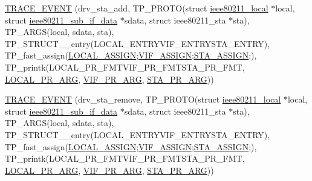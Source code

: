 \begin{DoxyCompactItemize}
\item 
\hyperlink{driver-trace_8h_a9ad991ec5ffa3b7c68a490dcf2170532}{T\-R\-A\-C\-E\-\_\-\-E\-V\-E\-N\-T} (drv\-\_\-sta\-\_\-add, T\-P\-\_\-\-P\-R\-O\-T\-O(struct \hyperlink{structieee80211__local}{ieee80211\-\_\-local} $\ast$local, struct \hyperlink{structieee80211__sub__if__data}{ieee80211\-\_\-sub\-\_\-if\-\_\-data} $\ast$sdata, struct ieee80211\-\_\-sta $\ast$sta), T\-P\-\_\-\-A\-R\-G\-S(local, sdata, sta), T\-P\-\_\-\-S\-T\-R\-U\-C\-T\-\_\-\-\_\-entry(L\-O\-C\-A\-L\-\_\-\-E\-N\-T\-R\-Y\-V\-I\-F\-\_\-\-E\-N\-T\-R\-Y\-S\-T\-A\-\_\-\-E\-N\-T\-R\-Y), T\-P\-\_\-fast\-\_\-assign(\hyperlink{driver-trace_8h_ab19d9141887ea92ef9640df06a51e0a1}{L\-O\-C\-A\-L\-\_\-\-A\-S\-S\-I\-G\-N};\hyperlink{driver-trace_8h_af5ede80f04ffcb3f644f68837b1d252c}{V\-I\-F\-\_\-\-A\-S\-S\-I\-G\-N};\hyperlink{driver-trace_8h_abbd837b5fc444c0cb48b5954f8ad068a}{S\-T\-A\-\_\-\-A\-S\-S\-I\-G\-N};), T\-P\-\_\-printk(L\-O\-C\-A\-L\-\_\-\-P\-R\-\_\-\-F\-M\-T\-V\-I\-F\-\_\-\-P\-R\-\_\-\-F\-M\-T\-S\-T\-A\-\_\-\-P\-R\-\_\-\-F\-M\-T, \hyperlink{driver-trace_8h_aa2a77a17621ecb4f0b3926fec90a5538}{L\-O\-C\-A\-L\-\_\-\-P\-R\-\_\-\-A\-R\-G}, \hyperlink{driver-trace_8h_a12c9f3afcd1c461f7ae2f86fd8503977}{V\-I\-F\-\_\-\-P\-R\-\_\-\-A\-R\-G}, \hyperlink{driver-trace_8h_a3b71cc34bae124028f19970a4220d4ab}{S\-T\-A\-\_\-\-P\-R\-\_\-\-A\-R\-G}))
\item 
\hyperlink{driver-trace_8h_a595ece6ce37c8e2a3284d14397af0385}{T\-R\-A\-C\-E\-\_\-\-E\-V\-E\-N\-T} (drv\-\_\-sta\-\_\-remove, T\-P\-\_\-\-P\-R\-O\-T\-O(struct \hyperlink{structieee80211__local}{ieee80211\-\_\-local} $\ast$local, struct \hyperlink{structieee80211__sub__if__data}{ieee80211\-\_\-sub\-\_\-if\-\_\-data} $\ast$sdata, struct ieee80211\-\_\-sta $\ast$sta), T\-P\-\_\-\-A\-R\-G\-S(local, sdata, sta), T\-P\-\_\-\-S\-T\-R\-U\-C\-T\-\_\-\-\_\-entry(L\-O\-C\-A\-L\-\_\-\-E\-N\-T\-R\-Y\-V\-I\-F\-\_\-\-E\-N\-T\-R\-Y\-S\-T\-A\-\_\-\-E\-N\-T\-R\-Y), T\-P\-\_\-fast\-\_\-assign(\hyperlink{driver-trace_8h_ab19d9141887ea92ef9640df06a51e0a1}{L\-O\-C\-A\-L\-\_\-\-A\-S\-S\-I\-G\-N};\hyperlink{driver-trace_8h_af5ede80f04ffcb3f644f68837b1d252c}{V\-I\-F\-\_\-\-A\-S\-S\-I\-G\-N};\hyperlink{driver-trace_8h_abbd837b5fc444c0cb48b5954f8ad068a}{S\-T\-A\-\_\-\-A\-S\-S\-I\-G\-N};), T\-P\-\_\-printk(L\-O\-C\-A\-L\-\_\-\-P\-R\-\_\-\-F\-M\-T\-V\-I\-F\-\_\-\-P\-R\-\_\-\-F\-M\-T\-S\-T\-A\-\_\-\-P\-R\-\_\-\-F\-M\-T, \hyperlink{driver-trace_8h_aa2a77a17621ecb4f0b3926fec90a5538}{L\-O\-C\-A\-L\-\_\-\-P\-R\-\_\-\-A\-R\-G}, \hyperlink{driver-trace_8h_a12c9f3afcd1c461f7ae2f86fd8503977}{V\-I\-F\-\_\-\-P\-R\-\_\-\-A\-R\-G}, \hyperlink{driver-trace_8h_a3b71cc34bae124028f19970a4220d4ab}{S\-T\-A\-\_\-\-P\-R\-\_\-\-A\-R\-G}))

\end{DoxyCompactItemize}
